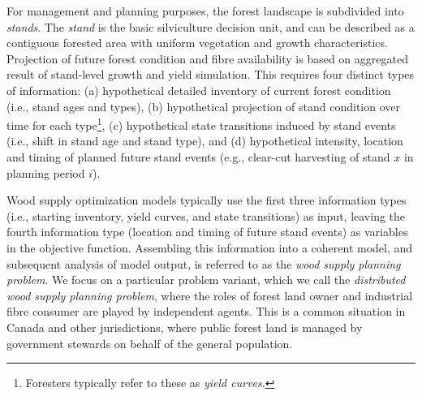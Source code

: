 For management and planning purposes, the forest landscape is subdivided into \emph{stands}. 
The \emph{stand} is the basic silviculture decision unit, and can be described as a contiguous forested area with uniform vegetation and growth characteristics. 
Projection of future forest condition and fibre availability is based on aggregated result of stand-level growth and yield simulation. 
This requires four distinct types of information: (a) hypothetical detailed inventory of current forest condition (i.e., stand ages and types), (b) hypothetical projection of stand condition over time for each type\footnote{Foresters typically refer to these as \emph{yield curves}.}, (c) hypothetical state transitions induced by stand events (i.e., shift in stand age and stand type), and (d) hypothetical intensity, location and timing of planned future stand events (e.g., clear-cut harvesting of stand $x$ in planning period $i$). 


Wood supply optimization models typically use the first three information types (i.e., starting inventory, yield curves, and state transitions) as input, leaving the fourth information type (location and timing of future stand events) as variables in the objective function. 
Assembling this information into a coherent model, and subsequent analysis of model output, is referred to as the \emph{wood supply planning problem}. 
We focus on a particular problem variant, which we call the \emph{distributed wood supply planning problem}, where the roles of forest land owner and industrial fibre consumer are played by independent agents. 
This is a common situation in Canada and other jurisdictions, where public forest land is managed by government stewards on behalf of the general population.


